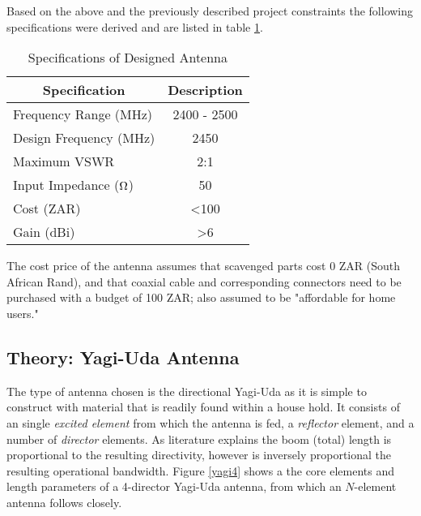\documentclass[10pt,twocolumn,hidelinks]{witseiepaper}
\begin{document}
Based on the above and the previously described project constraints the
following specifications were derived and are listed in table
\ref{tab:specs}.

\begin{table}[!h]
    \begin{center}
        \caption{Specifications of Designed Antenna}
        \label{tab:specs}
        \begin{tabular}{ l c }
            \hline
            \multicolumn{1}{c}{Specification} &
            \multicolumn{1}{c}{Description}                 \\
            \hline
            Frequency Range (MHz)             & 2400 - 2500 \\

            Design Frequency (MHz)            & 2450        \\

            Maximum VSWR                      & 2:1         \\

            Input Impedance ($\ohm$)          & 50          \\

            Cost (ZAR)                        & <100        \\

            Gain (dBi)                        & >6          \\

            \hline
        \end{tabular}

    \end{center}

\end{table}

The cost price of the antenna assumes that scavenged parts cost 0 ZAR
(South African Rand), and that coaxial cable and corresponding connectors
need to be purchased with a budget of 100 ZAR; also assumed to be
"affordable for home users."

\subsection{Theory: Yagi-Uda Antenna}
\label{theory}
The type of antenna chosen is the directional Yagi-Uda as it is simple to
construct with material that is readily found within a house hold. It
consists of an single \textit{excited element} from which the antenna is
fed, a \textit{reflector} element, and a number of \textit{director}
elements. As literature \cite[p. 67-68]{clark_fourie_2002} explains the
boom (total) length is proportional to the resulting directivity, however
is inversely proportional the resulting operational bandwidth. Figure
\ref{yagi4} shows a the core elements and length parameters of a 4-director
Yagi-Uda antenna, from which an $N$-element antenna follows closely.
\end{document}
